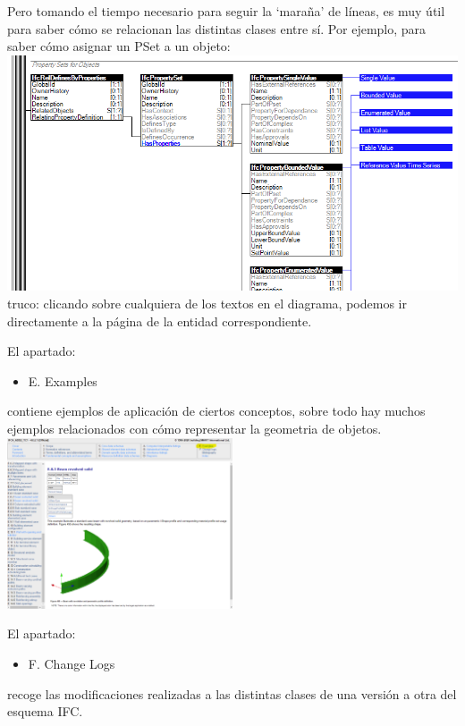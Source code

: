 \documentclass[spanish,10pt,a4paper,final,oneside]{article}
\begin{document}
Pero tomando el tiempo necesario para seguir la `maraña' de líneas, es muy útil para saber cómo se relacionan las distintas clases entre sí. Por ejemplo, para saber cómo asignar un PSet a un objeto: 
\\ \includegraphics[width=\textwidth]{IFC4 - D - Instance Diagrams - PSet to Door}
\\truco: clicando sobre cualquiera de los textos en el diagrama, podemos ir directamente a la página de la entidad correspondiente.


\vspace{0.5cm}
El apartado:
\begin{itemize}
\item E. Examples
\end{itemize}
contiene ejemplos de aplicación de ciertos conceptos, sobre todo hay muchos ejemplos relacionados con cómo representar la geometria de objetos.
\\ \includegraphics[width=0.5\textwidth]{IFC4 - E - Examples}

\vspace{0.5cm}
El apartado:
\begin{itemize}
\item F. Change Logs
\end{itemize}
recoge las modificaciones realizadas a las distintas clases de una versión a otra del esquema IFC.
\end{document}

